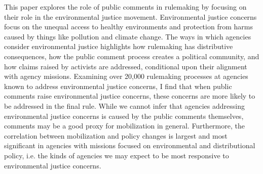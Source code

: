 This paper explores the role of public comments in rulemaking by focusing on their role in the environmental
justice movement. Environmental justice concerns focus on the unequal access to healthy environments and
protection from harms caused by things like pollution and climate change. The ways in which agencies
consider environmental justice highlights how rulemaking has distributive consequences, how the public
comment process creates a political community, and how claims raised by activists are addressed, conditional
upon their alignment with agency missions. Examining over 20,000 rulemaking processes at agencies known
to address environmental justice concerns, I find that when public comments raise environmental justice
concerns, these concerns are more likely to be addressed in the final rule. While we cannot infer that agencies
addressing environmental justice concerns is caused by the public comments themselves, comments may be
a good proxy for mobilization in general. Furthermore, the correlation between mobilization and policy
changes is largest and most significant in agencies with missions focused on environmental and distributional
policy, i.e. the kinds of agencies we may expect to be most responsive to environmental justice concerns.